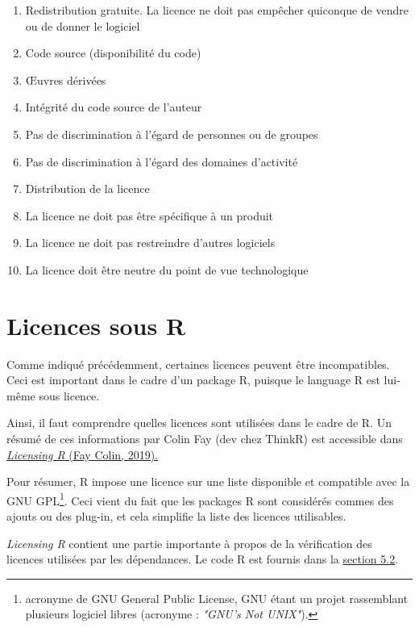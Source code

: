 \documentclass[12pt, colorinlistoftodos]{article}
\begin{document}
\begin{enumerate}
    \item Redistribution gratuite. La licence ne doit pas empêcher quiconque de vendre ou de donner le logiciel
    \item Code source (disponibilité du code)
    \item Œuvres dérivées
    \item Intégrité du code source de l'auteur
    \item Pas de discrimination à l'égard de personnes ou de groupes
    \item Pas de discrimination à l'égard des domaines d'activité
    \item Distribution de la licence
    \item La licence ne doit pas être spécifique à un produit
    \item La licence ne doit pas restreindre d'autres logiciels
    \item La licence doit être neutre du point de vue technologique
\end{enumerate}

\section{Licences sous R}

Comme indiqué précédemment, certaines licences peuvent être incompatibles.
Ceci est important dans le cadre d'un package R, puisque le language R est lui-même sous licence.

Ainsi, il faut comprendre quelles licences sont utilisées dans le cadre de R.
Un résumé de ces informations par Colin Fay (dev chez ThinkR) est accessible dans \href{https://thinkr-open.github.io/licensing-r/}{\textit{Licensing R} (Fay Colin, 2019).}

Pour résumer, R impose une licence sur une liste disponible et compatible avec la GNU GPL\footnote{acronyme de GNU General Public License, GNU étant un projet rassemblant plusieurs logiciel libres (acronyme : \textit{"GNU’s Not UNIX"}).}. 
Ceci vient du fait que les packages R sont considérés commes des ajouts ou des plug-in, et cela simplifie la liste des licences utilisables.

\textit{Licensing R} contient une partie importante à propos de la vérification des licences utilisées par les dépendances.
Le code R est fournis dans la \href{https://thinkr-open.github.io/licensing-r/practical.html#dependencies-exploration}{section 5.2}.
\end{document}
